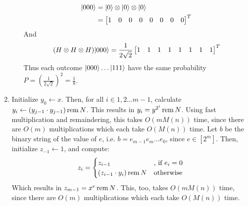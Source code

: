\documentclass[11pt,a4paper]{article}
\begin{document}
\begin{enumerate}
\begin{enumerate}
                    \begin{align*}
                        |000\rangle & = |0\rangle \otimes |0\rangle \otimes |0\rangle \\
                                 & = \begin{bmatrix}
                                         1 & 0 & 0 & 0 & 0 & 0 & 0 & 0
                                     \end{bmatrix}^T
                    \end{align*}
                    And
                    \begin{align*}
                        (H \otimes H \otimes H)|000\rangle = \frac{1}{2\sqrt{2}} \begin{bmatrix}
                                                                                  1 & 1 & 1 & 1 & 1 & 1 & 1 & 1
                                                                              \end{bmatrix}^T
                    \end{align*}
                    Thus each outcome $|000\rangle \dots |111\rangle$ have the same probability $P = (\frac{1}{2\sqrt{2}})^2 = \frac{1}{8}$.
          \end{enumerate}
          \newpage
    \item Initialize $y_0 \gets x$. Then, for all $i \in 1, 2 \dots m - 1$, calculate \\ $y_i \gets (y_{j-1} \cdot y_{j-1}) \operatorname{rem}{N}$.
          This results in $y_i = y^{2^i} \operatorname{rem}{N}$. Using fast multiplication and remaindering, this takes $O(mM(n))$ time, since there are $O(m)$ multiplications which each take
          $O(M(n))$ time. Let $b$ be the binary string of the value of $e$, i.e. $b = e_{m-1} e_m \dots e_0$, since $e \in [2^m]$.
          Then, initialize $z_{-1} \gets 1$, and compute:
          \begin{align*}
              z_i = \begin{cases}
                        z_{i - 1}                     & \text{, if }  e_i = 0 \\
                        (z_{i - 1} \cdot y_i) \operatorname{rem}{N} & \text{otherwise}
                    \end{cases}
          \end{align*}
          Which results in $z_{m - 1} = x^e \operatorname{rem}{N}$. This, too, takes $O(mM(n))$ time, since there are $O(m)$ multiplications which each take $O(M(n))$ time.
          \newpage
\end{enumerate}
\end{document}
